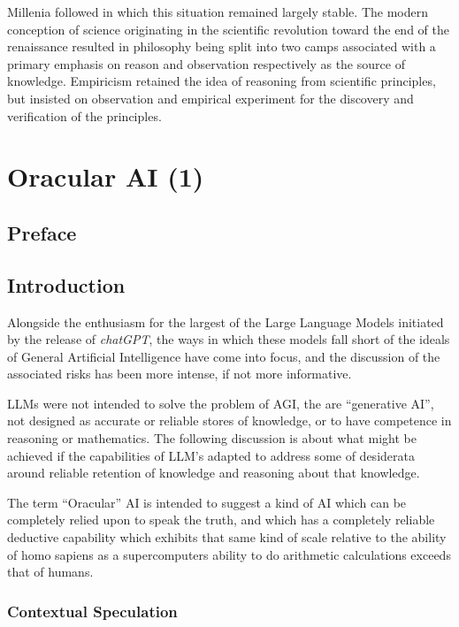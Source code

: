 \documentclass[10pt,titlepage]{book}
\begin{document}
Millenia followed in which this situation remained largely stable.
The modern conception of science originating in the scientific revolution toward the end of the renaissance resulted in philosophy being split into two camps associated with a primary emphasis on reason and observation respectively as the source of knowledge.
Empiricism retained the idea of reasoning from scientific principles, but insisted on observation and empirical experiment for the discovery and verification of the principles.


\chapter{Oracular AI (1)}

\section*{Preface}

\section{Introduction}

Alongside the enthusiasm for the largest of the Large Language Models initiated by the release of \emph{chatGPT}, the ways in which these models fall short of the ideals of General Artificial Intelligence have come into focus, and the discussion of the associated risks has been more intense, if not more informative.

LLMs were not intended to solve the problem of AGI, the are ``generative AI'', not designed as accurate or reliable stores of knowledge, or to have competence in reasoning or mathematics.
The following discussion is about what might be achieved if the capabilities of LLM's adapted to address some of desiderata around reliable retention of knowledge and reasoning about that knowledge.

The term ``Oracular'' AI is intended to suggest a kind of AI which can be completely relied upon to speak the truth, and which has a completely reliable deductive capability which exhibits that same kind of scale relative to the ability of homo sapiens as a supercomputers ability to do arithmetic calculations exceeds that of humans.

\subsection{Contextual Speculation}
\end{document}
